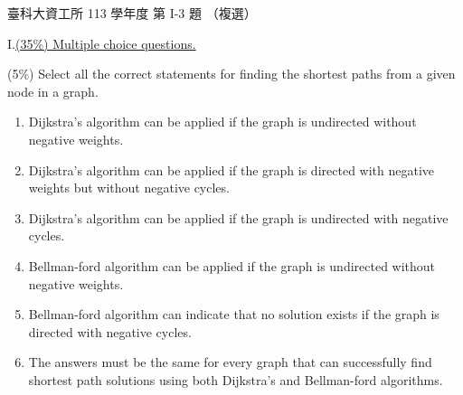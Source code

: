 \begin{pastexam}[label={px:ntust-113-ice-03}]{臺科大資工所 113 學年度 第 I-3 題}
（複選）

I.\quad \underline{(35\%) Multiple choice questions.}

(5\%) Select all the correct statements for finding the shortest paths from a given node in a graph.
\begin{enumerate}[label=(\alph*)]
\item Dijkstra's algorithm can be applied if the graph is undirected without negative weights.
\item Dijkstra's algorithm can be applied if the graph is directed with negative weights but without
negative cycles.
\item Dijkstra's algorithm can be applied if the graph is undirected with negative cycles.
\item Bellman-ford algorithm can be applied if the graph is undirected without negative weights.
\item Bellman-ford algorithm can indicate that no solution exists if the graph is directed with
negative cycles.
\item The answers must be the same for every graph that can successfully find shortest path
solutions using both Dijkstra's and Bellman-ford algorithms.
\end{enumerate}
\end{pastexam}

